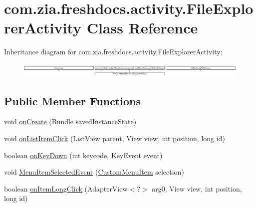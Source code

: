 \hypertarget{classcom_1_1zia_1_1freshdocs_1_1activity_1_1_file_explorer_activity}{\section{com.\-zia.\-freshdocs.\-activity.\-File\-Explorer\-Activity Class Reference}
\label{classcom_1_1zia_1_1freshdocs_1_1activity_1_1_file_explorer_activity}
}
Inheritance diagram for com.\-zia.\-freshdocs.\-activity.\-File\-Explorer\-Activity\-:\begin{figure}[H]
\begin{center}
\leavevmode
\includegraphics[height=0.678788cm]{classcom_1_1zia_1_1freshdocs_1_1activity_1_1_file_explorer_activity}
\end{center}
\end{figure}
\subsection*{Public Member Functions}
\begin{DoxyCompactItemize}
\item 
void \hyperlink{classcom_1_1zia_1_1freshdocs_1_1activity_1_1_file_explorer_activity_a0ec434d633fd6f876cc905a9bccdd42b}{on\-Create} (Bundle saved\-Instance\-State)
\item 
void \hyperlink{classcom_1_1zia_1_1freshdocs_1_1activity_1_1_file_explorer_activity_af3f7cd27fb46e2607ea9d1a63a059e3d}{on\-List\-Item\-Click} (List\-View parent, View view, int position, long id)
\item 
boolean \hyperlink{classcom_1_1zia_1_1freshdocs_1_1activity_1_1_file_explorer_activity_a5141a76c0ab2f089f901137d987a3e50}{on\-Key\-Down} (int keycode, Key\-Event event)
\item 
void \hyperlink{classcom_1_1zia_1_1freshdocs_1_1activity_1_1_file_explorer_activity_a02e0c8ea573e62cf3e6a675b6705186c}{Menu\-Item\-Selected\-Event} (\hyperlink{classcom_1_1zia_1_1freshdocs_1_1widget_1_1fileexplorer_1_1custommenu_1_1_custom_menu_item}{Custom\-Menu\-Item} selection)
\item 
boolean \hyperlink{classcom_1_1zia_1_1freshdocs_1_1activity_1_1_file_explorer_activity_ace89e1839c79ba3cd8334252d8b84f4c}{on\-Item\-Long\-Click} (Adapter\-View$<$?$>$ arg0, View view, int position, long id)
\end{DoxyCompactItemize}

